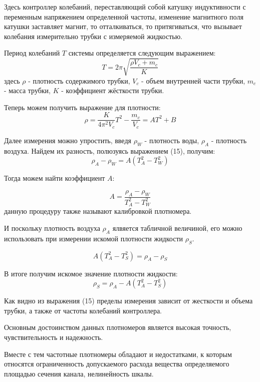 \documentclass[russian, utf8, 12pt]{eskdtext}
\begin{document}
Здесь контроллер колебаний, переставляющий собой катушку индуктивности с переменным напряжением определенной частоты, изменение магнитного поля катушки заставляет магнит, то отталкиваться, то притягиваться, что вызывает колебания измерительно трубки с измеряемой жидкостью. \par

Период колебаний $T$ системы определяется следующим выражением:
\begin{equation}
	T = 2\pi \sqrt{\frac{\rho V_c + m_c}{K}}
\end{equation}
здесь $\rho$ - плотность содержимого трубки, $V_c$ - объем внутренней части трубки, $m_c$ - масса трубки, $K$ - коэффициент жёсткости трубки. \par

Теперь можем получить выражение для плотности: 
\begin{equation*}
	\rho = \frac{K}{4\pi^2 V_c}T^2 - \frac{m_c}{V_c} = AT^2 + B
\end{equation*}

Далее измерения можно упростить, введя $\rho_W$ - плотность воды, $\rho_A$ - плотность воздуха. Найдем их разность, полюзуясь выражением (15), получим:
\begin{equation*}
	\rho_A - \rho_W = A(T_A^2 - T_W^2)
\end{equation*}

Тогда можем найти коэффициент $A$:

\begin{equation*}
	A = \frac{\rho_A - \rho_W}{T_A^2 - T_W^2}
\end{equation*}
данную процедуру также называют калибровкой плотномера.

И поскольку плотность воздуха $\rho_A$ ялвяется табличной величиной, его можно использовать при измерении искомой плотности жидкости $\rho_S$.

\begin{equation*}
	A(T_A^2 - T_S^2) = \rho_A - \rho_S
\end{equation*}

В итоге получим искомое значение плотности жидкости:
\begin{equation}
	\rho_S = \rho_A - A(T_A^2 - T_S^2)
\end{equation}

Как видно из выражения (15) пределы измерения зависит от жесткости и объема трубки, а также от частоты колебаний контроллера. \par
Основным достоинством данных плотномеров является высокая точность, чувствительность и надежность. \par
Вместе с тем частотные плотномеры обладают и недостатками, к которым относятся ограниченность допускаемого расхода вещества определяемого площадью сечения канала, нелинейность шкалы. \par
\end{document}
